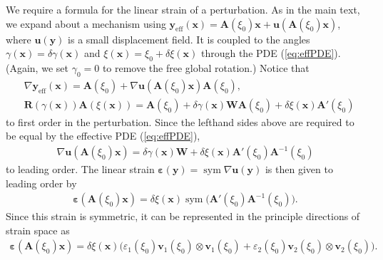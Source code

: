 \documentclass[aps,11pt,tightenlines,notitlepage,superscriptaddress,longbibliography,nofootinbib]{revtex4-1}
\DeclareMathOperator{\sym}{sym}
\begin{document}
We require a formula for the linear strain of a perturbation. 
As in the main text, we expand about a mechanism using $\mathbf{y}_{\text{eff}}(\mathbf{x}) = \mathbf{A}(\xi_0)\mathbf{x} + \mathbf{u}(\mathbf{A}(\xi_0) \mathbf{x})$, where $\mathbf{u}(\mathbf{y})$ is a small displacement field. It is coupled to the angles $\gamma(\mathbf{x})  = \delta \gamma(\mathbf{x})$ and $\xi(\mathbf{x}) = \xi_0 + \delta \xi(\mathbf{x})$ through the PDE (\ref{eq:effPDE}). (Again, we set $\gamma_0=0$ to remove the free global rotation.) Notice that 
\begin{equation}
    \begin{aligned}
    &\nabla \mathbf{y}_{\text{eff}}(\mathbf{x}) = \mathbf{A}(\xi_0) + \nabla \mathbf{u}(\mathbf{A}(\xi_0) \mathbf{x}) \mathbf{A}(\xi_0),\\
    & \mathbf{R}(\gamma(\mathbf{x})) \mathbf{A}(\xi(\mathbf{x})) = \mathbf{A}(\xi_0) + \delta \gamma(\mathbf{x}) \mathbf{W} \mathbf{A}(\xi_0) + \delta \xi(\mathbf{x}) \mathbf{A}'(\xi_0) 
    \end{aligned}
\end{equation}
to first order in the perturbation.
Since the lefthand sides above are required to be equal by the effective PDE (\ref{eq:effPDE}),   
\begin{equation}
 \begin{aligned}\label{eq:uDisp}
 \nabla \mathbf{u}(\mathbf{A}(\xi_0)\mathbf{x}) = \delta \gamma(\mathbf{x}) \mathbf{W} + \delta \xi(\mathbf{x}) \mathbf{A}'(\xi_0) \mathbf{A}^{-1}(\xi_0)
 \end{aligned}
\end{equation}
to leading order. The linear strain  $\boldsymbol{\varepsilon}(\mathbf{y}) = \sym \nabla \mathbf{u}(\mathbf{y})$ is then given to leading order by
\begin{equation}
    \begin{aligned}\label{eq:firstAux} 
    \boldsymbol{\varepsilon}(\mathbf{A}(\xi_0)\mathbf{x}) = \delta \xi(\mathbf{x}) \sym \big(\mathbf{A}'(\xi_0) \mathbf{A}^{-1}(\xi_0)\big).
    \end{aligned}
\end{equation}
Since this strain is symmetric, it can be represented in the principle directions of strain space as 
\begin{equation}
    \begin{aligned}\label{eq:spectralAux}
    \boldsymbol{\varepsilon}(\mathbf{A}(\xi_0)\mathbf{x})  = \delta \xi(\mathbf{x}) \Big( \varepsilon_1(\xi_0) \mathbf{v}_1(\xi_0) \otimes \mathbf{v}_1(\xi_0) + \varepsilon_2(\xi_0) \mathbf{v}_2(\xi_0) \otimes \mathbf{v}_2(\xi_0)\Big).
    \end{aligned}
\end{equation}
\end{document}

